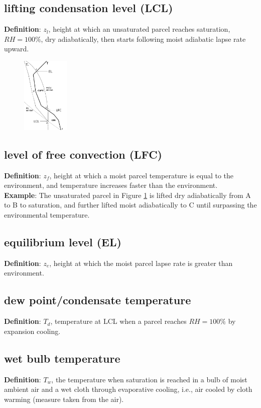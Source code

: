 \subsection{lifting condensation level (LCL)}
{\bf Definition}: $z_l$, height at which an unsaturated parcel reaches saturation, $RH=100\%$, dry
adiabatically, then starts following moist adiabatic lapse rate upward. 
\begin{figure} [H] 
   \includegraphics[width=0.2\textwidth, height=0.3\textwidth]{sounding.png}
   \caption{\label{sounding}}
\end{figure}

\subsection{level of free convection (LFC)}
{\bf Definition}: $z_f$, height at which a moist parcel temperature is equal to the environment,
and temperature increases faster than the environment. \\

{\bf Example}: The unsaturated parcel in Figure {\ref{sounding}} is lifted dry adiabatically from A
to B to saturation, and further lifted moist adiabatically to C until surpassing the environmental
temperature.

\subsection{equilibrium level (EL)}
{\bf Definition}: $z_e$, height at which the moist parcel lapse rate is greater than environment.

\subsection{dew point/condensate temperature}
{\bf Definition}: $T_d$, temperature at LCL when a parcel reaches $RH=100\%$ by expansion cooling.

\subsection{wet bulb temperature}
{\bf Definition}: $T_w$, the temperature when saturation is reached in a bulb of moist ambient air
and a wet cloth through evaporative cooling, i.e., air cooled by cloth warming (measure taken from
the air). \\ 

